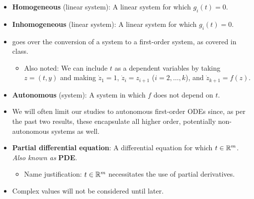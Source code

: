\documentclass[../notes.tex]{subfiles}
\begin{document}
\begin{itemize}
\begin{itemize}
    \end{itemize}
    \item \textbf{Homogeneous} (linear system): A linear system for which $g_i(t)=0$.
    \item \textbf{Inhomogeneous} (linear system): A linear system for which $g_i(t)=0$.
    \item \textcite{bib:Teschl} goes over the conversion of a system to a first-order system, as covered in class.
    \begin{itemize}
        \item Also noted: We can include $t$ as a dependent variables by taking $z=(t,y)$ and making $\dot{z}_1=1$, $\dot{z}_i=z_{i+1}$ ($i=2,\dots,k$), and $\dot{z}_{k+1}=f(z)$.
    \end{itemize}
    \item \textbf{Autonomous} (system): A system in which $f$ does not depend on $t$.
    \item We will often limit our studies to autonomous first-order ODEs since, as per the past two results, these encapsulate all higher order, potentially non-autonomous systems as well.
    \item \textbf{Partial differential equation}: A differential equation for which $t\in\mathbb{R}^m$. \emph{Also known as} \textbf{PDE}.
    \begin{itemize}
        \item Name justification: $t\in\mathbb{R}^m$ necessitates the use of partial derivatives.
    \end{itemize}
    \item Complex values will not be considered until later.
\end{itemize}
\end{document}
